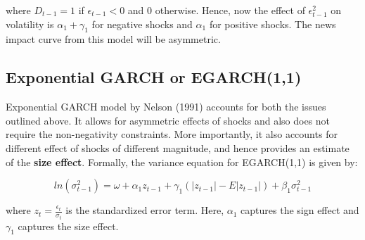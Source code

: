 \documentclass[]{book}
\theoremstyle{definition}
\theoremstyle{definition}
\theoremstyle{definition}
\theoremstyle{remark}
\begin{document}
where \(D_{t-1}=1\) if \(\epsilon_{t-1}<0\) and \(0\) otherwise. Hence,
now the effect of \(\epsilon^2_{t-1}\) on volatility is
\(\alpha_1+\gamma_1\) for negative shocks and \(\alpha_1\) for positive
shocks. The news impact curve from this model will be asymmetric.

\hypertarget{exponential-garch-or-egarch11}{%
\subsection{Exponential GARCH or
EGARCH(1,1)}\label{exponential-garch-or-egarch11}}

Exponential GARCH model by Nelson (1991) accounts for both the issues
outlined above. It allows for asymmetric effects of shocks and also does
not require the non-negativity constraints. More importantly, it also
accounts for different effect of shocks of different magnitude, and
hence provides an estimate of the \textbf{size effect}. Formally, the
variance equation for EGARCH(1,1) is given by:

\[ln(\sigma^2_{t-1})=\omega+ \alpha_1 z_{t-1} +\gamma_1 (|z_{t-1}|-E|z_{t-1}|) +\beta_1\sigma^2_{t-1}\]

where \(z_t=\frac{\epsilon_t}{\sigma_t}\) is the standardized error
term. Here, \(\alpha_1\) captures the sign effect and \(\gamma_1\)
captures the size effect.


\end{document}
